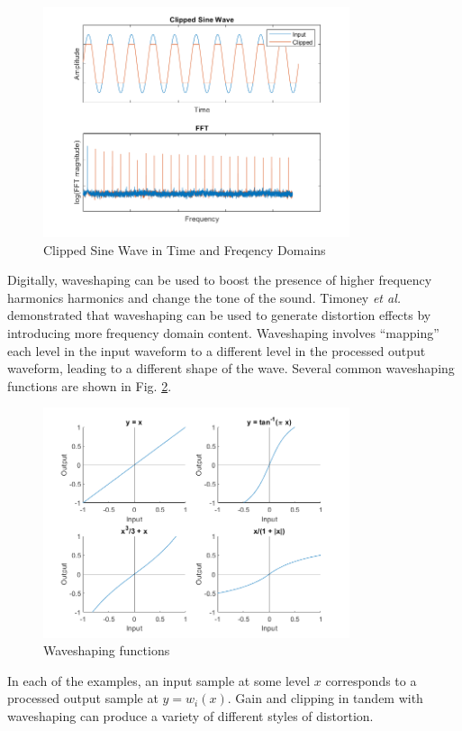 \documentclass[conference]{IEEEtran}
\begin{document}
\begin{figure}[htbp]
    \centerline{\includegraphics[width=9cm]{dist_fft.png}}
    \caption{Clipped Sine Wave in Time and Freqency Domains}
    \label{fig:dist_fft}
\end{figure}

Digitally, waveshaping can be used to boost the presence of higher frequency harmonics harmonics and change the tone of the sound. Timoney \textit{et al.} \cite{digital_dist} demonstrated that waveshaping can be used to generate distortion effects by introducing more frequency domain content. Waveshaping involves ``mapping'' each level in the input waveform to a different level in the processed output waveform, leading to a different shape of the wave. Several common waveshaping functions are shown in Fig. \ref{fig:waveshape_fns}.

\begin{figure}[htbp]
    \centerline{\includegraphics[width=9cm]{waveshape_fns.png}}
    \caption{Waveshaping functions}
    \label{fig:waveshape_fns}
\end{figure}

In each of the examples, an input sample at some level $x$ corresponds to a processed output sample at $y = w_i(x)$. Gain and clipping in tandem with waveshaping can produce a variety of different styles of distortion. 
\end{document}
